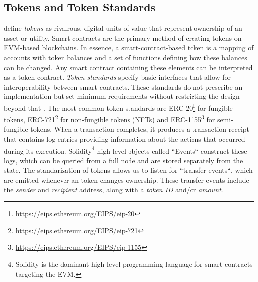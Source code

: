 \documentclass[12pt,a4paper,titlepage,oneside,english]{article}
\begin{document}
\subsection{Tokens and Token Standards}
\cite{roth2019tokenization} define \textit{tokens} as rivalrous, digital units of value that represent ownership of an asset or utility. Smart contracts are the primary method of creating tokens on EVM-based blockchains. In essence, a smart-contract-based token is a mapping of accounts with token balances and a set of functions defining how these balances can be changed. Any smart contract containing these elements can be interpreted as a token contract. \citep{roth2019tokenization} \newline
\textit{Token standards} specify basic interfaces that allow for interoperability between smart contracts. These standards do not prescribe an implementation but set minimum requirements without restricting the design beyond that \citep{mastering_ethereum}. 
The most common token standards are ERC-20\footnote{\url{https://eips.ethereum.org/EIPS/eip-20}} for fungible tokens, ERC-721\footnote{\url{https://eips.ethereum.org/EIPS/eip-721}} for non-fungible tokens (NFTs) and ERC-1155\footnote{\url{https://eips.ethereum.org/EIPS/eip-1155}} for semi-fungible tokens.\newline
When a transaction completes, it produces a transaction receipt  that contains log entries providing information about the actions that occurred during its execution. Solidity\footnote{Solidity is the dominant high-level programming language for smart contracts targeting the EVM.} high-level objects called ``Events`` construct these logs, which can be queried from a full node and are stored separately from the state. \citep{mastering_ethereum} \newline
The standarization of tokens allows us to listen for ``transfer events``, which are emitted whenever an token changes ownership.
These transfer events include the \textit{sender} and \textit{recipient} address, along with a \textit{token ID} and/or \textit{amount}. 
\end{document}
